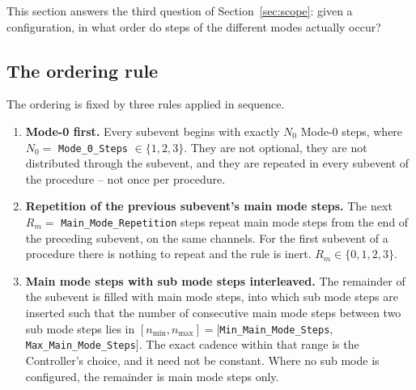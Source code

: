 \documentclass[11pt,a4paper]{article}
\newcommand{\code}[1]{\texttt{\small #1}}
\begin{document}
This section answers the third question of Section~\ref{sec:scope}: given a configuration, in what
order do steps of the different modes actually occur?

\subsection{The ordering rule}

The ordering is fixed by three rules applied in sequence.

\begin{enumerate}[leftmargin=1.6em,itemsep=3pt]
\item \textbf{Mode-0 first.} Every subevent begins with exactly $N_0$ Mode-0 steps, where
      $N_0 = $ \code{Mode\_0\_Steps} $\in \{1,2,3\}$. They are not optional, they are not distributed
      through the subevent, and they are repeated in every subevent of the procedure -- not once per
      procedure.
\item \textbf{Repetition of the previous subevent's main mode steps.} The next $R_m = $
      \code{Main\_Mode\_Repetition} steps repeat main mode steps from the end of the preceding
      subevent, on the same channels. For the first subevent of a procedure there is nothing to
      repeat and the rule is inert. $R_m \in \{0,1,2,3\}$.
\item \textbf{Main mode steps with sub mode steps interleaved.} The remainder of the subevent is
      filled with main mode steps, into which sub mode steps are inserted such that the number of
      consecutive main mode steps between two sub mode steps lies in
      $[n_{\min}, n_{\max}] = [$\code{Min\_Main\_Mode\_Steps}, \code{Max\_Main\_Mode\_Steps}$]$. The
      exact cadence within that range is the Controller's choice, and it need not be constant. Where
      no sub mode is configured, the remainder is main mode steps only.
\end{enumerate}
\end{document}
